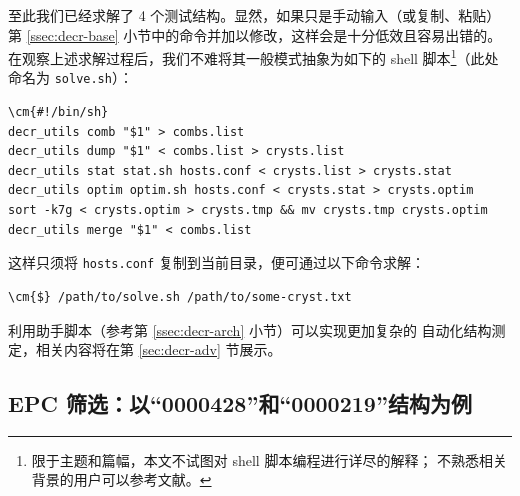 至此我们已经求解了 4 个测试结构。显然，如果只是手动输入（或复制、粘贴）第
\ref{ssec:decr-base} 小节中的命令并加以修改，这样会是十分低效且容易出错的。
在观察上述求解过程后，我们不难将其一般模式抽象为如下的 shell 脚本\footnote{%
	限于主题和篇幅，本文不试图对 shell 脚本编程进行详尽的解释；
	不熟悉相关背景的用户可以参考文献\parencite{robbins2005}。%
}（此处命名为 \verb|solve.sh|）：
\begin{Verbatim}
\cm{#!/bin/sh}
decr_utils comb "$1" > combs.list
decr_utils dump "$1" < combs.list > crysts.list
decr_utils stat stat.sh hosts.conf < crysts.list > crysts.stat
decr_utils optim optim.sh hosts.conf < crysts.stat > crysts.optim
sort -k7g < crysts.optim > crysts.tmp && mv crysts.tmp crysts.optim
decr_utils merge "$1" < combs.list
\end{Verbatim}
这样只须将 \verb|hosts.conf| 复制到当前目录，便可通过以下命令求解：
\begin{Verbatim}
\cm{$} /path/to/solve.sh /path/to/some-cryst.txt
\end{Verbatim}
利用助手脚本（参考第 \ref{ssec:decr-arch} 小节）可以实现更加复杂的
自动化结构测定，相关内容将在第 \ref{sec:decr-adv} 节展示。

\subsection{EPC 筛选：以“0000428”和“0000219”结构为例}\label{ssec:epc-rank}


